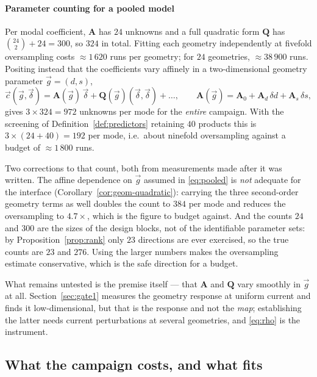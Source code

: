 \documentclass[11pt,a4paper]{article}
\newcommand{\vect}[1]{\mathbf{#1}}
\theoremstyle{plain}
\theoremstyle{definition}
\theoremstyle{remark}
\begin{document}
\label{rem:counting}
\paragraph{Parameter counting for a pooled model}
Per modal coefficient, $\vect{A}$ has $24$ unknowns and a full quadratic form
$\vect{Q}$ has $\binom{24}{2}+24 = 300$, so $324$ in total. Fitting each
geometry independently at fivefold oversampling costs $\approx1\,620$ runs per
geometry; for $24$ geometries, $\approx38\,900$ runs. Positing instead that the
coefficients vary affinely in a two-dimensional geometry parameter
$\vec{g}=(d,s)$,
\begin{equation}
\label{eq:pooled}
\vec{c}(\vec{g},\vec\delta) = \vect{A}(\vec{g})\,\vec\delta
+ \vect{Q}(\vec{g})(\vec\delta,\vec\delta)+\dots,
\qquad
\vect{A}(\vec{g}) = \vect{A}_0 + \vect{A}_d\,\delta d + \vect{A}_s\,\delta s,
\end{equation}
gives $3\times324 = 972$ unknowns per mode for the \emph{entire} campaign. With
the screening of Definition~\ref{def:predictors} retaining $40$ products this is
$3\times(24+40) = 192$ per mode, i.e.\ about ninefold oversampling against a
budget of $\approx1\,800$ runs.

Two corrections to that count, both from measurements made after it was written.
The affine dependence on $\vec{g}$ assumed in \eqref{eq:pooled} is
\emph{not} adequate for the interface
(Corollary~\ref{cor:geom-quadratic}): carrying the three second-order geometry
terms as well doubles the count to $384$ per mode and reduces the oversampling
to $4.7\times$, which is the figure to budget against. And the counts $24$ and
$300$ are the sizes of the design blocks, not of the identifiable parameter
sets: by Proposition~\ref{prop:rank} only $23$ directions are ever exercised, so
the true counts are $23$ and $276$. Using the larger numbers makes the
oversampling estimate conservative, which is the safe direction for a budget.

What remains untested is the premise itself --- that $\vect{A}$ and $\vect{Q}$
vary smoothly in $\vec{g}$ at all. Section~\ref{sec:gate1} measures the geometry
response at uniform current and finds it low-dimensional, but that is the
response and not the \emph{map}; establishing the latter needs current
perturbations at several geometries, and \eqref{eq:rho} is the instrument.

\subsection{What the campaign costs, and what fits}
\label{sec:cost}
\end{document}

